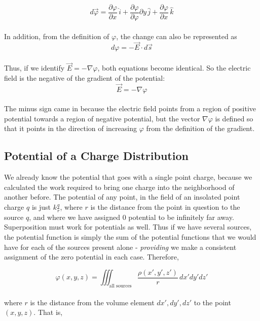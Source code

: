 \documentclass[svgnames]{article}
\begin{document}
\[d\vec{\varphi} = \frac{\partial \varphi}{\partial x} \, \hat{i} + \frac{\partial \varphi}{\partial \varphi}{\partial y} \, \hat{j} + \frac{\partial \varphi}{\partial x} \, \hat{k} \] \\

In addition, from the definition of $\varphi$, the change can also be represented as \\

\[ d\varphi = - \vec{E} \cdot d\vec{s} \] \\

Thus, if we identify $\vec{E} = - \nabla \varphi$, both equations become identical. So the electric field is the negative of the gradient of the potential:\\

 \[ \vec{E} = - \nabla \varphi \] \\
 
 The minus sign came in because the electric field points from a region of positive potential towards a region of negative potential, but the vector $\nabla \varphi$ is defined so that it points in the direction of increasing $\varphi$ from the definition of the gradient. \\
 
 \subsection{Potential of a Charge Distribution}
 
 We already know the potential that goes with a single point charge, because we calculated the work required to bring one charge into the neighborhood of another before. The potential of any point, in the field of an insolated point charge $q$ is just $k\frac{q}{r}$, where $r$ is the distance from the point in question to the source $q$, and where we have assigned 0 potential to be infinitely far away.  \\
 
 Superposition must work for potentials as well. Thus if we have several sources, the potential function is simply the sum of the potential functions that we would have for each of the sources present alone - \textit{providing} we make a consistent assignment of the zero potential in each case. Therefore, 
 
 \[ \varphi(x, y, z) = \iiint_\text{all sources} \frac{\rho (x', y', z')}{r} \, dx'dy'dz' \] \\
 
 where $r$ is the distance from the volume element $dx', dy', dz'$ to the point $(x, y, z)$. That is, 
 
\end{document}
